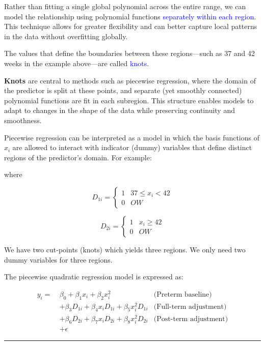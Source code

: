 \documentclass[
  letterpaper,
  DIV=11,
  numbers=noendperiod]{scrreprt}
\begin{document}
Rather than fitting a single global polynomial across the entire range,
we can model the relationship using polynomial functions
\textcolor{blue}{separately within each region}. This technique allows
for greater flexibility and can better capture local patterns in the
data without overfitting globally.

The values that define the boundaries between these regions---such as 37
and 42 weeks in the example above---are called \textcolor{blue}{knots}.

\textbf{Knots} are central to methods such as piecewise regression,
where the domain of the predictor is split at these points, and separate
(yet smoothly connected) polynomial functions are fit in each subregion.
This structure enables models to adapt to changes in the shape of the
data while preserving continuity and smoothness.

Piecewise regression can be interpreted as a model in which the basis
functions of \(x_i\) are allowed to interact with indicator (dummy)
variables that define distinct regions of the predictor's domain. For
example:

where

\[
D_{1i} =
\begin{cases}
1 & 37 \leq x_i < 42\\
0 & OW
\end{cases}
\]

\[
D_{2i} =
\begin{cases}
1 &  x_i \geq 42\\
0 & OW
\end{cases}
\]

We have two cut-points (knots) which yields three regions. We only need
two dummy variables for three regions.

The piecewise quadratic regression model is expressed as:

\[
\begin{aligned}
y_i =\ & \beta_0 + \beta_1 x_i + \beta_2 x_i^2 & \text{(Preterm baseline)} \\
& + \beta_3 D_{1i} + \beta_4 x_i D_{1i} + \beta_5 x_i^2 D_{1i} & \text{(Full-term adjustment)} \\
& + \beta_6 D_{2i} + \beta_7 x_i D_{2i} + \beta_8 x_i^2 D_{2i} & \text{(Post-term adjustment)}\\
& + \epsilon
\end{aligned}
\]

\begin{center}\rule{0.5\linewidth}{0.5pt}\end{center}
\end{document}
